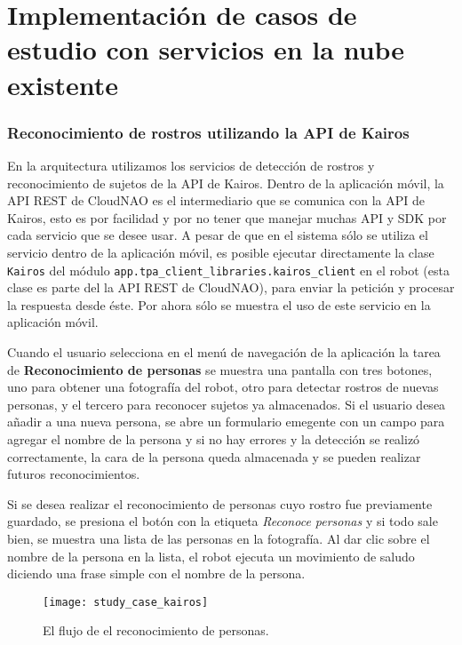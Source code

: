 
\section{Implementación de casos de estudio con servicios en la nube existente}
\label{\detokenize{chapter_two/study_cases_implementation:implementacion-de-casos-de-estudio-con-servicios-en-la-nube-existente}}\label{\detokenize{chapter_two/study_cases_implementation::doc}}


\subsubsection{Reconocimiento de rostros utilizando la API de Kairos}

En la arquitectura utilizamos los servicios de detección de rostros y reconocimiento
de sujetos de la API de Kairos.
Dentro de la aplicación móvil, la API REST de CloudNAO es el intermediario
que se comunica con la API de Kairos, esto es por facilidad y por no
tener que manejar muchas API y SDK por cada servicio que se desee usar.
A pesar de que en el sistema sólo se utiliza el servicio
dentro de la aplicación móvil, es posible ejecutar directamente la clase
\texttt{Kairos} del módulo \texttt{app.tpa\_client\_libraries.kairos\_client}
en el robot (esta clase es parte del la API REST de CloudNAO), para enviar la petición y procesar la respuesta desde éste.
Por ahora sólo se muestra el uso de este servicio en la aplicación móvil.

Cuando el usuario selecciona en el menú de navegación de la aplicación
la tarea de \textbf{Reconocimiento de personas} se muestra una pantalla 
con tres botones, uno para obtener una fotografía del robot, otro para
detectar rostros de nuevas personas, y el tercero para reconocer sujetos
ya almacenados. Si el usuario desea añadir a una nueva persona, se abre un
formulario emegente con un campo para agregar el nombre de la persona y
si no hay errores y la detección se realizó correctamente,
la cara de la persona queda almacenada y se pueden realizar futuros reconocimientos.

Si se desea realizar el reconocimiento de personas cuyo rostro
fue previamente guardado, se presiona el botón con la etiqueta
\textit{Reconoce personas} y si todo sale bien,
se muestra una lista de las personas en la fotografía.
Al dar clic sobre el nombre de la persona en la lista, el robot ejecuta
un movimiento de saludo diciendo una frase simple con el nombre de la persona.

\begin{figure}[!h]
\centering
\caption{El flujo de el reconocimiento de personas.}
\texttt{[image: study\_case\_kairos]}
\end{figure}

